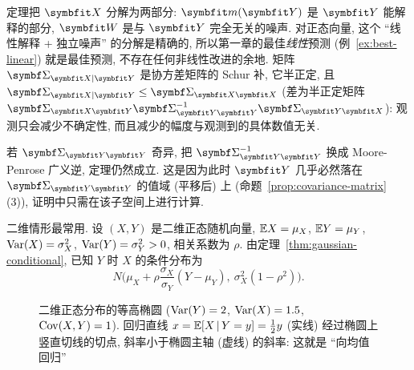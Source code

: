 \begin{intuition}
定理把 $\rvec{X}$ 分解为两部分: $\rvec{m}(\rvec{Y})$ 是 $\rvec{Y}$ 能解释的部分, $\rvec{W}$ 是与 $\rvec{Y}$ 完全无关的噪声. 对正态向量, 这个 ``线性解释 + 独立噪声'' 的分解是精确的, 所以第一章的最佳\emph{线性}预测 (例~\ref{ex:best-linear}) 就是最佳预测, 不存在任何非线性改进的余地. 矩阵 $\mat{\Sigma}_{\rvec{X}|\rvec{Y}}$ 是协方差矩阵的 Schur 补, 它半正定, 且 $\mat{\Sigma}_{\rvec{X}|\rvec{Y}}\le\mat{\Sigma}_{\rvec{X}\rvec{X}}$ (差为半正定矩阵 $\mat{\Sigma}_{\rvec{X}\rvec{Y}}\mat{\Sigma}_{\rvec{Y}\rvec{Y}}^{-1}\mat{\Sigma}_{\rvec{Y}\rvec{X}}$): 观测只会减少不确定性, 而且减少的幅度与观测到的具体数值无关.
\end{intuition}

\begin{remark}
若 $\mat{\Sigma}_{\rvec{Y}\rvec{Y}}$ 奇异, 把 $\mat{\Sigma}_{\rvec{Y}\rvec{Y}}^{-1}$ 换成 Moore-Penrose 广义逆, 定理仍然成立. 这是因为此时 $\rvec{Y}$ 几乎必然落在 $\mat{\Sigma}_{\rvec{Y}\rvec{Y}}$ 的值域 (平移后) 上 (命题~\ref{prop:covariance-matrix} (3)), 证明中只需在该子空间上进行计算.
\end{remark}

二维情形最常用. 设 $(X,Y)$ 是二维正态随机向量, $\mathbb{E} X=\mu_X$, $\mathbb{E} Y=\mu_Y$, $\operatorname{Var}(X)=\sigma_X^2$, $\operatorname{Var}(Y)=\sigma_Y^2>0$, 相关系数为 $\rho$. 由定理~\ref{thm:gaussian-conditional}, 已知 $Y$ 时 $X$ 的条件分布为
\begin{equation}\label{eq:bivariate-conditional}
N\Big(\mu_X+\rho\frac{\sigma_X}{\sigma_Y}(Y-\mu_Y),\ \sigma_X^2(1-\rho^2)\Big).
\end{equation}

\begin{figure}[htbp]
\centering
{}
\caption{二维正态分布的等高椭圆 ($\operatorname{Var}(Y)=2$, $\operatorname{Var}(X)=1.5$, $\operatorname{Cov}(X,Y)=1$). 回归直线 $x=\mathbb{E}[X\,|\,Y=y]=\frac{1}{2}y$ (实线) 经过椭圆上竖直切线的切点, 斜率小于椭圆主轴 (虚线) 的斜率: 这就是 ``向均值回归''}
\label{fig:regression}
\end{figure}

